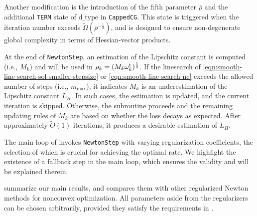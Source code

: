 Another modification is the introduction of the fifth parameter $\bar\rho$ and the additional \texttt{TERM} state of $\text{d\_type}$ in \texttt{CappedCG}.
This state is triggered when the iteration number exceeds $\tilde \Omega( \bar\rho^{-\frac{1}{2}})$, and is designed to ensure non-degenerate global complexity in terms of Hessian-vector products. 

At the end of \texttt{NewtonStep}, an estimation of the Lipschitz constant is computed (i.e., $M_k$) and will be used in $\rho_k = (M_k \omega^{\mathrm{t}}_k)^{\frac{1}{2}}$.
If the linesearch of \eqref{eqn:smooth-line-search-sol-smaller-stepsize} or \eqref{eqn:smooth-line-search-nc} exceeds the allowed number of steps (i.e., $m_{\mathrm{max}}$), 
it indicates $M_k$ is an underestimation of the Lipschitz constant $L_H$.
In such cases, 
the estimation is updated, and the current iteration is skipped.
Otherwise, the subroutine proceeds and 
the remaining updating rules of $M_k$ are based on whether the loss decays as expected.
After approximately $\tilde O(1)$ iterations, it produces a desirable estimation of $L_H$.

The main loop of  invokes \texttt{NewtonStep} with varying regularization coefficients, 
the selection of which is crucial for achieving the optimal rate.
We highlight the existence of a fallback step in the main loop, which ensures the validity  and will be explained therein.

 summarize our main results, 
and  compares them with other regularized Newton methods for nonconvex optimization. 
All parameters aside from the regularizers can be chosen arbitrarily, provided they satisfy the requirements in .


